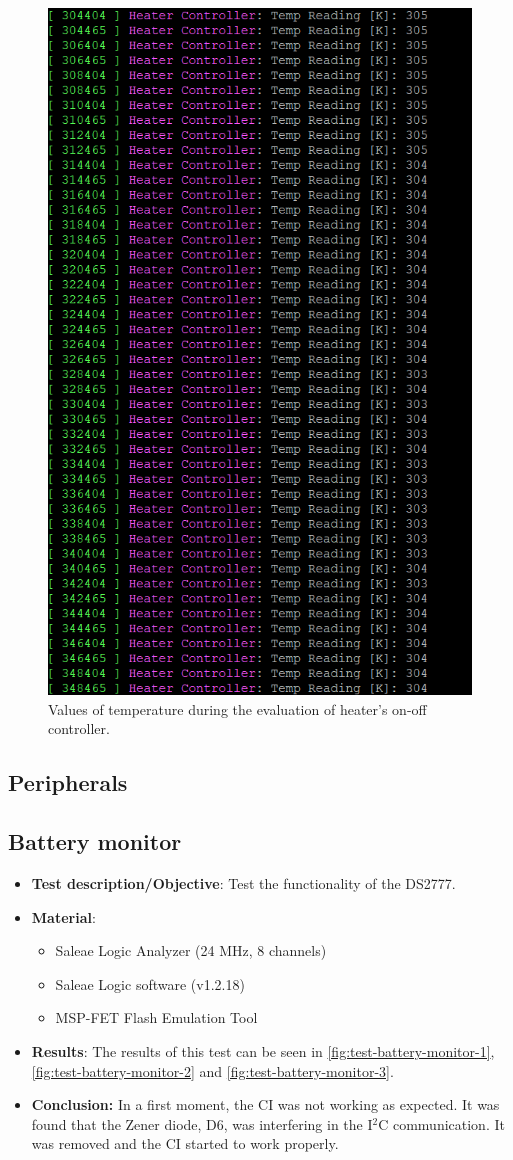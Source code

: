 \begin{figure}[!ht]
    \begin{center}
        \includegraphics[width=0.5\columnwidth]{figures/test_heater.PNG}
        \caption{Values of temperature during the evaluation of heater's on-off controller.}
        \label{fig:test-temperature}
    \end{center}
\end{figure}

\subsection{Peripherals}

\subsection{Battery monitor}

\begin{itemize}
    \item \textbf{Test description/Objective}: Test the functionality of the DS2777.
    \item \textbf{Material}:
        \begin{itemize}
            \item Saleae Logic Analyzer (24 MHz, 8 channels)
            \item Saleae Logic software (v1.2.18)
            \item MSP-FET Flash Emulation Tool
        \end{itemize}
    \item \textbf{Results}: The results of this test can be seen in \autoref{fig:test-battery-monitor-1}, \autoref{fig:test-battery-monitor-2} and \autoref{fig:test-battery-monitor-3}.
    \item \textbf{Conclusion:} In a first moment, the CI was not working as expected. It was found that the Zener diode, D6, was interfering in the I$^{2}$C communication. It was removed and the CI started to work properly.  
\end{itemize}

